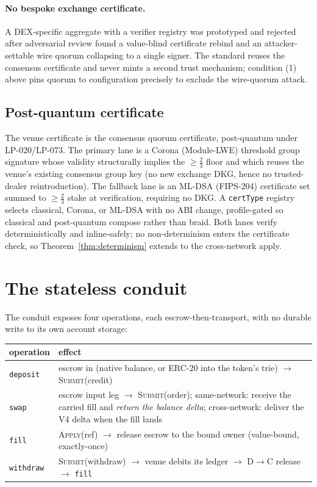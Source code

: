 \documentclass[11pt,a4paper]{article}
\begin{document}
\paragraph{No bespoke exchange certificate.} A DEX-specific aggregate with a verifier registry was
prototyped and rejected after adversarial review found a value-blind certificate rebind and an
attacker-settable wire quorum collapsing to a single signer. The standard reuses the consensus
certificate and never mints a second trust mechanism; condition (1) above pins quorum to
configuration precisely to exclude the wire-quorum attack.

\subsection{Post-quantum certificate}
The venue certificate is the consensus quorum certificate, post-quantum under LP-020/LP-073. The
primary lane is a Corona (Module-LWE) threshold group signature whose validity structurally implies
the $\geq\tfrac{2}{3}$ floor and which reuses the venue's existing consensus group key (no new
exchange DKG, hence no trusted-dealer reintroduction). The fallback lane is an ML-DSA (FIPS-204)
certificate set summed to $\geq\tfrac{2}{3}$ stake at verification, requiring no DKG. A
\texttt{certType} registry selects classical, Corona, or ML-DSA with no ABI change, profile-gated
so classical and post-quantum compose rather than braid. Both lanes verify deterministically and
inline-safely; no non-determinism enters the certificate check, so Theorem~\ref{thm:determinism}
extends to the cross-network apply.

\section{The stateless conduit}
\label{sec:conduit}

The conduit exposes four operations, each escrow-then-transport, with no durable write to its own
account storage:

\begin{table}[H]
\centering
\begin{tabularx}{\textwidth}{lX}
\toprule
\textbf{operation} & \textbf{effect} \\
\midrule
\texttt{deposit} & escrow in (native balance, or ERC-20 into the token's trie) $\to$ \textsc{Submit}(credit) \\
\texttt{swap}    & escrow input leg $\to$ \textsc{Submit}(order); same-network: receive the carried fill and \emph{return the balance delta}; cross-network: deliver the V4 delta when the fill lands \\
\texttt{fill}    & \textsc{Apply}(ref) $\to$ release escrow to the bound owner (value-bound, exactly-once) \\
\texttt{withdraw}& \textsc{Submit}(withdraw) $\to$ venue debits its ledger $\to$ D$\to$C release $\to$ \texttt{fill} \\
\bottomrule
\end{tabularx}
\end{table}
\end{document}
